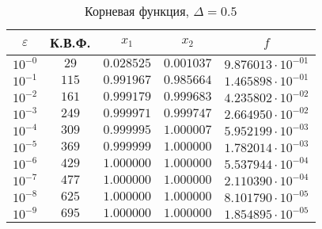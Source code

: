 \documentclass[a4paper,12pt,notitlepage,pdftex,headsepline]{scrartcl}
\begin{document}
        \begin{table}[ht]
          \centering
          \caption{Корневая функция, $\Delta = 0.5$}
          \begin{tabular}{|c|c|c|c|c|}
            \hline
            $\varepsilon$ & К.В.Ф. & $x_1$ & $x_2$ & $f$\\
            \hline
            $10^{-0}$ & $29$ & $0.028525$ & $0.001037$ & $9.876013\cdot 10^{-01}$\\
            $10^{-1}$ & $115$ & $0.991967$ & $0.985664$ & $1.465898\cdot 10^{-01}$\\
            $10^{-2}$ & $161$ & $0.999179$ & $0.999683$ & $4.235802\cdot 10^{-02}$\\
            $10^{-3}$ & $249$ & $0.999971$ & $0.999747$ & $2.664950\cdot 10^{-02}$\\
            $10^{-4}$ & $309$ & $0.999995$ & $1.000007$ & $5.952199\cdot 10^{-03}$\\
            $10^{-5}$ & $369$ & $0.999999$ & $1.000000$ & $1.782014\cdot 10^{-03}$\\
            $10^{-6}$ & $429$ & $1.000000$ & $1.000000$ & $5.537944\cdot 10^{-04}$\\
            $10^{-7}$ & $477$ & $1.000000$ & $1.000000$ & $2.110390\cdot 10^{-04}$\\
            $10^{-8}$ & $625$ & $1.000000$ & $1.000000$ & $8.101790\cdot 10^{-05}$\\
            $10^{-9}$ & $695$ & $1.000000$ & $1.000000$ & $1.854895\cdot 10^{-05}$\\
            \hline
          \end{tabular}
        \end{table}
\end{document}
